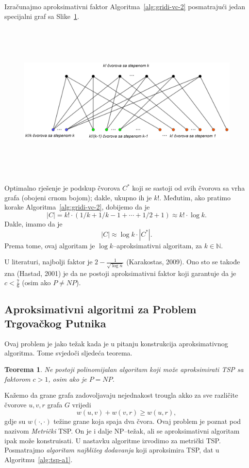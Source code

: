\documentclass[a4paper, utf8, 11pt, colorlinks]{book}
\newtheorem{thm}{Teorema}
\begin{document}
  \noindent Izračunajmo aproksimativni faktor Algoritma~\ref{alg:gridi-vc-2} posmatrajući jedan specijalni graf sa Slike~\ref{vertex-cover}. 
  
  
  \begin{figure}
  	\centering
  	\includegraphics[width=120mm,height=80mm]{vc-2-example.eps}
  	\label{vertex-cover}
 
  \end{figure}
  
  Optimalno rješenje je podskup čvorova $C^*$ koji se sastoji od svih čvorova sa vrha grafa (obojeni crnom bojom); dakle, ukupno ih je $k!$. Međutim, ako pratimo korake Algoritma~\ref{alg:gridi-vc-2}, dobijemo 
  da je $$|C| = k!\cdot( 1/k + 1/k-1 + \cdots + 1/2 + 1) \approx k! \cdot \log k.$$  
  Dakle, imamo da je
  $$   |C| \approx \log k \cdot |C^*|.$$ Prema tome, ovaj algoritam je $\log k$--aproksimativni algoritam, za $k \in \mathbb{N}$. 
  
  \noindent U literaturi, najbolji faktor je $2 - \frac{1}{\sqrt{\log n}}$ (Karakostas, 2009).
  Ono sto se takođe zna (Hastad, 2001) je da ne postoji aproksimativni faktor 
  koji garantuje da je $c < \frac{7}{6}$ (osim ako $P \neq NP$). 
  
  \subsection{Aproksimativni algoritmi za Problem Trgovačkog Putnika}
  
  Ovaj problem je jako težak kada je u pitanju konstrukcija aproksimativnog algoritma. Tome svjedoči sljedeća teorema.
 \begin{thm}
    Ne postoji polinomijalan algoritam koji može aproksimirati TSP sa  faktorom $c > 1$, osim ako je $P = NP$. 
\end{thm}
  Kažemo da grane grafa zadovoljavaju nejednakost trougla akko za sve različite čvorove $u,v, r$ grafa $G$ vrijedi
  $$ w(u,v) + w(v,r) \geq w(u,r),$$
  gdje su $w(\cdot, \cdot)$ težine grane koja spaja dva čvora. Ovaj problem je poznat 
  pod nazivom \emph{Metrički} TSP. On je i dalje NP--težak, ali se aproksimativni algoritam ipak može konstruisati.  U nastavku algoritme izvodimo za metrički  TSP. Posmatrajmo \emph{algoritam najbližeg dodavanja} koji aproksimira TSP, dat u Algoritmu~\ref{alg:tsp-a1}. 
  
\end{document}
